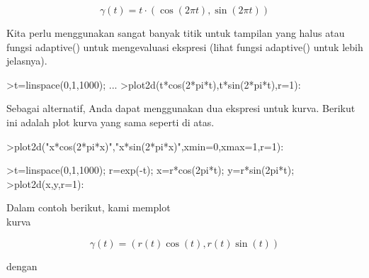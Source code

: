 \documentclass[12pt,arial,letterpaper]{book}
\begin{document}
\begin{eulernootebook}
\begin{eulercomment}
\begin{eulercomment}
\begin{eulernootebook}
\begin{eulercomment}
\begin{eulercomment}
\begin{eulercomment}
\begin{eulercomment}
\begin{eulercomment}
\begin{eulercomment}
\begin{eulercomment}
\begin{eulernotebook}
\begin{eulercomment}
\begin{eulercomment}
\begin{eulercomment}
\begin{eulercomment}
\begin{eulercomment}
\end{eulercomment}
\begin{eulerformula}
\[
\gamma(t) = t \cdot (\cos(2\pi t),\sin(2\pi t))
\]
\end{eulerformula}
\begin{eulercomment}
Kita perlu menggunakan sangat banyak titik untuk tampilan yang halus
atau fungsi adaptive() untuk mengevaluasi ekspresi (lihat fungsi
adaptive() untuk lebih jelasnya).
\end{eulercomment}
\begin{eulerprompt}
>t=linspace(0,1,1000); ...
>plot2d(t*cos(2*pi*t),t*sin(2*pi*t),r=1):
\end{eulerprompt}
\begin{eulercomment}
Sebagai alternatif, Anda dapat menggunakan dua ekspresi untuk kurva.
Berikut ini adalah plot kurva yang sama seperti di atas.
\end{eulercomment}
\begin{eulerprompt}
>plot2d("x*cos(2*pi*x)","x*sin(2*pi*x)",xmin=0,xmax=1,r=1):
\end{eulerprompt}
\begin{eulerprompt}
>t=linspace(0,1,1000); r=exp(-t); x=r*cos(2pi*t); y=r*sin(2pi*t);
>plot2d(x,y,r=1):
\end{eulerprompt}
\begin{eulercomment}
Dalam contoh berikut, kami memplot\\
kurva

\end{eulercomment}
\begin{eulerformula}
\[
\gamma(t) = (r(t) \cos(t), r(t) \sin(t))
\]
\end{eulerformula}
\begin{eulercomment}
dengan


\end{eulercomment}
\end{eulercomment}
\end{eulercomment}
\end{eulercomment}
\end{eulercomment}
\end{eulernotebook}
\end{eulercomment}
\end{eulercomment}
\end{eulercomment}
\end{eulercomment}
\end{eulercomment}
\end{eulercomment}
\end{eulercomment}
\end{eulernootebook}
\end{eulercomment}
\end{eulercomment}
\end{eulernootebook}
\end{document}
